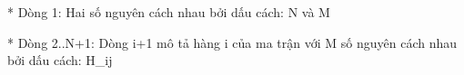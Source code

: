 * Dòng 1: Hai số nguyên cách nhau bởi dấu cách: N và M  

   * Dòng 2..N+1: Dòng i+1 mô tả hàng i của ma trận với M số nguyên cách nhau bởi dấu cách: H\_ij  

\